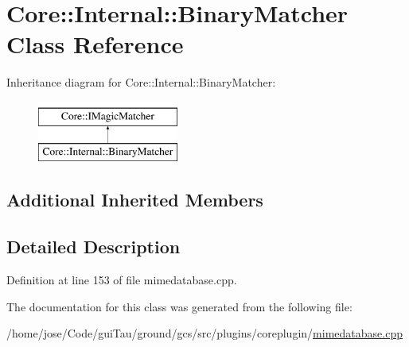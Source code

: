 \hypertarget{class_core_1_1_internal_1_1_binary_matcher}{\section{Core\-:\-:Internal\-:\-:Binary\-Matcher Class Reference}
\label{class_core_1_1_internal_1_1_binary_matcher}
}
Inheritance diagram for Core\-:\-:Internal\-:\-:Binary\-Matcher\-:\begin{figure}[H]
\begin{center}
\leavevmode
\includegraphics[height=2.000000cm]{class_core_1_1_internal_1_1_binary_matcher}
\end{center}
\end{figure}
\subsection*{Additional Inherited Members}


\subsection{Detailed Description}


Definition at line 153 of file mimedatabase.\-cpp.



The documentation for this class was generated from the following file\-:\begin{DoxyCompactItemize}
\item 
/home/jose/\-Code/gui\-Tau/ground/gcs/src/plugins/coreplugin/\hyperlink{mimedatabase_8cpp}{mimedatabase.\-cpp}\end{DoxyCompactItemize}
